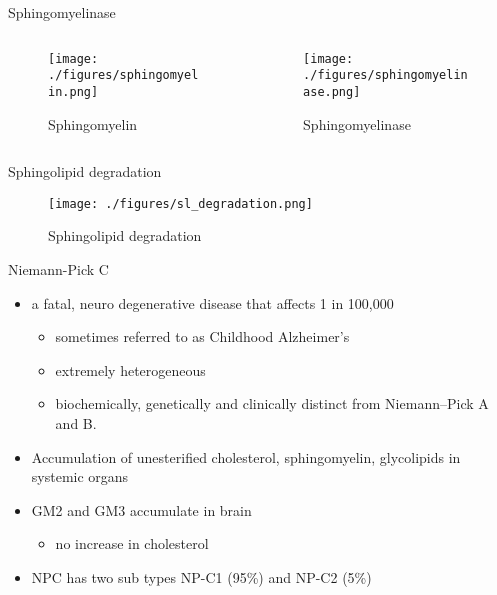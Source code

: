 \documentclass[presentation, smaller]{beamer}
\begin{document}
\begin{frame}[label={sec:orgheadline3}]{Sphingomyelinase}
\begin{columns}
\begin{column}{0.5\columnwidth}
\begin{figure}[htb]
\centering
\texttt{[image: ./figures/sphingomyelin.png]}
\caption{\label{fig:}
Sphingomyelin}
\end{figure}
\end{column}

\begin{column}{0.5\columnwidth}
\begin{figure}[htb]
\centering
\texttt{[image: ./figures/sphingomyelinase.png]}
\caption{\label{fig:}
Sphingomyelinase}
\end{figure}
\end{column}
\end{columns}
\end{frame}


\begin{frame}[label={sec:orgheadline4}]{Sphingolipid degradation}
\begin{figure}[htb]
\centering
\texttt{[image: ./figures/sl\_degradation.png]}
\caption[deg]{\label{fig:sld}
Sphingolipid degradation}
\end{figure}
\end{frame}

\begin{frame}[label={sec:orgheadline5}]{Niemann-Pick C}
\begin{itemize}
\item a fatal, neuro degenerative disease that affects 1 in 100,000
\begin{itemize}
\item sometimes referred to as Childhood Alzheimer’s
\item extremely heterogeneous
\item biochemically, genetically and clinically distinct from Niemann–Pick A and B.
\end{itemize}
\item Accumulation of unesterified cholesterol, sphingomyelin, glycolipids in systemic organs
\item GM2 and GM3 accumulate in brain
\begin{itemize}
\item no increase in cholesterol
\end{itemize}
\item NPC has two sub types NP-C1 (95\%) and NP-C2 (5\%)
\end{itemize}
\end{frame}
\end{document}

